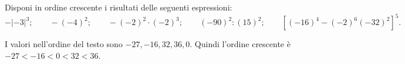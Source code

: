
\begin{esercizio}
Disponi in ordine crescente i risultati delle seguenti espressioni:
    \[
    -\lvert -3\rvert^3;\qquad
    -(-4)^2;\qquad
    -(-2)^2\cdot(-2)^3;\qquad
    (-90)^2:(15)^2;\qquad
    \left[(-16)^4-(-2)^6(-32)^2\right]^5.
    \]
\end{esercizio}

\begin{soluzione}
I valori nell'ordine del testo sono $-27,-16,32,36,0$.
Quindi l'ordine crescente è $-27<-16<0<32<36$.
\end{soluzione}
